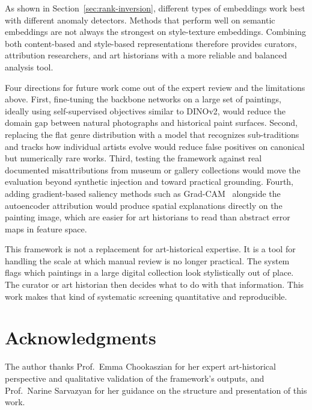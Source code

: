 \documentclass[conference]{IEEEtran}
\begin{document}
As shown in Section~\ref{sec:rank-inversion}, different types of embeddings work best with different anomaly detectors. Methods that perform well on semantic embeddings are not always the strongest on style-texture embeddings. Combining both content-based and style-based representations therefore provides curators, attribution researchers, and art historians with a more reliable and balanced analysis tool.

Four directions for future work come out of the expert review and the limitations above. First, fine-tuning the backbone networks on a large set of paintings, ideally using self-supervised objectives similar to DINOv2, would reduce the domain gap between natural photographs and historical paint surfaces. Second, replacing the flat genre distribution with a model that recognizes sub-traditions and tracks how individual artists evolve would reduce false positives on canonical but numerically rare works. Third, testing the framework against real documented misattributions from museum or gallery collections would move the evaluation beyond synthetic injection and toward practical grounding. Fourth, adding gradient-based saliency methods such as Grad-CAM~\cite{gradcam} alongside the autoencoder attribution would produce spatial explanations directly on the painting image, which are easier for art historians to read than abstract error maps in feature space.

This framework is not a replacement for art-historical expertise. It is a tool for handling the scale at which manual review is no longer practical. The system flags which paintings in a large digital collection look stylistically out of place. The curator or art historian then decides what to do with that information. This work makes that kind of systematic screening quantitative and reproducible.

\section*{Acknowledgments}

The author thanks Prof.\ Emma Chookaszian for her expert art-historical perspective and qualitative validation of the framework's outputs, and Prof.\ Narine Sarvazyan for her guidance on the structure and presentation of this work.



\end{document}
